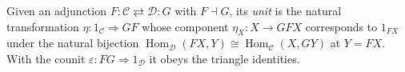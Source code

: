 
Given an adjunction $F:\mathcal C\rightleftarrows\mathcal D:G$ with $F\dashv G$, its \emph{unit} is the natural transformation $\eta:1_{\mathcal C}\Rightarrow G F$ whose component $\eta_X:X\to G F X$ corresponds to $1_{F X}$ under the natural bijection $\operatorname{Hom}_{\mathcal D}(F X,Y)\cong\operatorname{Hom}_{\mathcal C}(X,GY)$ at $Y=F X$. With the counit $\varepsilon:FG\Rightarrow1_{\mathcal D}$ it obeys the triangle identities.
